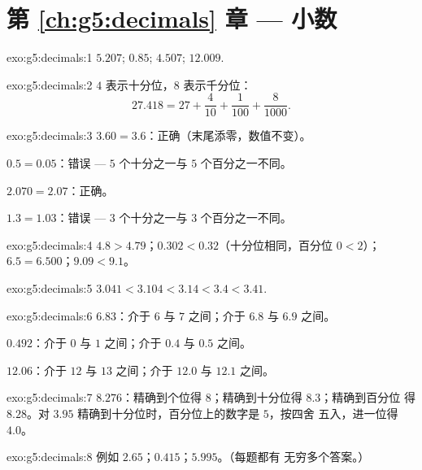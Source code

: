 \section*{第 \ref{ch:g5:decimals} 章 --- 小数}

\begin{solution}{exo:g5:decimals:1}
$5.207$; \quad $0.85$; \quad $4.507$; \quad $12.009$.
\end{solution}

\begin{solution}{exo:g5:decimals:2}
$4$ 表示十分位，$8$ 表示千分位：
\[
27.418 = 27 + \frac{4}{10} + \frac{1}{100} + \frac{8}{1000}.
\]
\end{solution}

\begin{solution}{exo:g5:decimals:3}
$3.60 = 3.6$：正确（末尾添零，数值不变）。

$0.5 = 0.05$：错误 --- $5$ 个十分之一与 $5$ 个百分之一不同。

$2.070 = 2.07$：正确。

$1.3 = 1.03$：错误 --- $3$ 个十分之一与 $3$ 个百分之一不同。
\end{solution}

\begin{solution}{exo:g5:decimals:4}
$4.8 > 4.79$；\quad $0.302 < 0.32$（十分位相同，百分位
$0 < 2$）；\quad $6.5 = 6.500$；\quad $9.09 < 9.1$。
\end{solution}

\begin{solution}{exo:g5:decimals:5}
$3.041 < 3.104 < 3.14 < 3.4 < 3.41$.
\end{solution}

\begin{solution}{exo:g5:decimals:6}
$6.83$：介于 $6$ 与 $7$ 之间；介于 $6.8$ 与 $6.9$ 之间。

$0.492$：介于 $0$ 与 $1$ 之间；介于 $0.4$ 与 $0.5$ 之间。

$12.06$：介于 $12$ 与 $13$ 之间；介于 $12.0$ 与 $12.1$ 之间。
\end{solution}

\begin{solution}{exo:g5:decimals:7}
$8.276$：精确到个位得 $8$；精确到十分位得 $8.3$；精确到百分位
得 $8.28$。对 $3.95$ 精确到十分位时，百分位上的数字是 $5$，按四舍
五入，进一位得 $4.0$。
\end{solution}

\begin{solution}{exo:g5:decimals:8}
例如 $2.65$；\quad $0.415$；\quad $5.995$。（每题都有
无穷多个答案。）
\end{solution}

